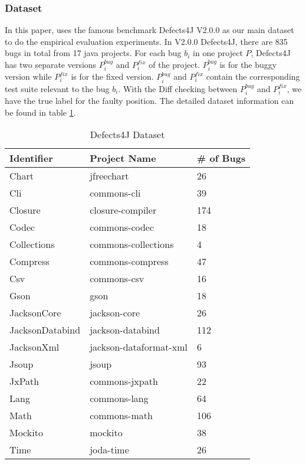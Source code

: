 \subsubsection{Dataset}

In this paper, \tool uses the famous benchmark Defects4J V2.0.0 \cite{defects4j} as our main dataset to do the empirical evaluation experiments. In V2.0.0 Defects4J, there are 835 bugs in total from 17 java projects. For each bug $b_i$ in one project $P$, Defects4J has two separate versions $P_i^{bug}$ and $P_i^{fix}$ of the project. $P_i^{bug}$ is for the buggy version while $P_i^{fix}$ is for the fixed version. $P_i^{bug}$ and $P_i^{fix}$ contain the corresponding test suite relevant to the bug $b_i$. With the Diff checking between $P_i^{bug}$ and $P_i^{fix}$, we have the true label for the faulty position. The detailed dataset information can be found in table \ref{dataset}.

\begin{table}[t]
	\caption{Defects4J Dataset}
	\begin{center}
		\renewcommand{\arraystretch}{1}
		\begin{tabular}{p{2.2cm}|p{3.3cm}|p{1.5cm}}
			\hline
			Identifier &  Project Name & \# of Bugs\\
			\hline
			Chart & jfreechart & 26\\
			Cli & 	commons-cli & 39\\
			Closure & closure-compiler	 & 174\\
			Codec & commons-codec & 18\\
			Collections & commons-collections & 4\\
			Compress & commons-compress	 & 47\\
			Csv & 	commons-csv & 16\\
			Gson & gson & 18\\
			JacksonCore & jackson-core & 26\\
			JacksonDatabind & jackson-databind	 & 112\\
			JacksonXml & 	jackson-dataformat-xml & 6\\
			Jsoup	 & jsoup & 93\\
			JxPath & commons-jxpath & 22\\
			Lang & 	commons-lang & 64\\
			Math & 	commons-math & 106\\
			Mockito	 & mockito & 38\\
			Time & joda-time & 26\\			
			\hline
		\end{tabular}
		\label{dataset}
	\end{center}
\end{table}